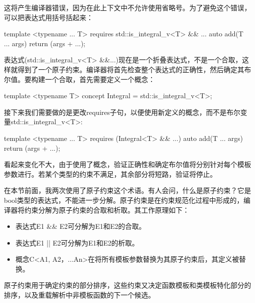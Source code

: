 这将产生编译器错误，因为在此上下文中不允许使用省略号。为了避免这个错误，可以把表达式用括号括起来：

\begin{cpp}
	template <typename ... T>
	requires std::is_integral_v<T> && ...
	auto add(T ... args)
	{
		return (args + ...);
	}
\end{cpp}

表达式(std::is\_integral\_v<T> \&\&...)现在是一个折叠表达式，不是一个合取，这样就得到了一个原子约束。编译器将首先检查整个表达式的正确性，然后确定其布尔值。要构建一个合取，首先需要定义一个概念：

\begin{cpp}
template <typename T>
concept Integral = std::is_integral_v<T>;
\end{cpp}

接下来我们需要做的是更改requires子句，以便使用新定义的概念，而不是布尔变量std::is\_integral\_v<T>:

\begin{cpp}
template <typename ... T>
requires (Integral<T> && ...)
auto add(T ... args)
{
	return (args + ...);
}
\end{cpp}

看起来变化不大，由于使用了概念，验证正确性和确定布尔值将分别针对每个模板参数进行。若某个类型的约束不满足，其余部分将短路，验证将停止。

在本节前面，我两次使用了原子约束这个术语。有人会问，什么是原子约束？它是bool类型的表达式，不能进一步分解。原子约束是在约束规范化过程中形成的，编译器将约束分解为原子约束的合取和析取。其工作原理如下：

\begin{itemize}
\item
表达式E1 \&\& E2可分解为E1和E2的合取。

\item
表达式E1 || E2可分解为E1和E2的析取。

\item
概念C<A1, A2，...An>在将所有模板参数替换为其原子约束后，其定义被替换。
\end{itemize}

原子约束用于确定约束的部分排序，这些约束又决定函数模板和类模板特化部分的排序，以及重载解析中非模板函数的下一个候选。











